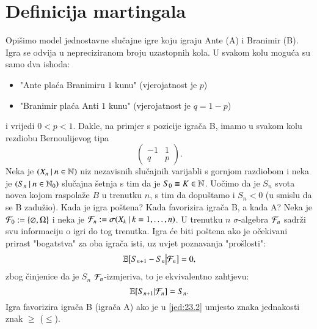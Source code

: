 
\chapter{Definicija martingala}

\begin{pr}  \label{pr:23.1}
    Opi\v simo model jednostavne slu\v cajne igre koju igraju Ante (A) i Branimir (B).
    Igra se odvija u nepreciziranom broju uzastopnih kola.
    U svakom kolu mogu\' ca su samo dva ishoda:
    \begin{itemize}
        \item[] "Ante pla\' ca Branimiru $1$ kunu" (vjerojatnost je $p$)
        \item[] "Branimir pla\' ca Anti $1$ kunu" (vjerojatnost je $q = 1 - p$) 
    \end{itemize}
    i vrijedi $0 < p < 1$.
    Dakle, na primjer s pozicije igra\v ca B, imamo u svakom kolu rezdiobu Bernoulijevog tipa
    \begin{equation*}
        \begin{pmatrix}
            -1& 1\\
            q& p
        \end{pmatrix}.
    \end{equation*}
    Neka je $({X_n} \: | \: {n \in \mathbb{N}})$ niz nezavisnih slu\v cajnih varijabli s gornjom razdiobom i neka je $({S_n} \: | \: {n \in \mathbb{N}_0})$ slu\v cajna \v setnja s tim da je $S_0 \equiv K \in \mathbb{N}$.
    Uo\v cimo da je $S_n$ svota novca kojom raspola\v ze $B$ u trenutku $n$, s tim da dopu\v stamo i $S_n < 0$ (u smislu da se B zadu\v zio).
    Kada je igra po\v stena?
    Kada favorizira igra\v ca B, a kada A?
    Neka je $\mathcal{F}_0 := \{ \varnothing, \Omega \}$ i neka je $\mathcal{F}_n := \sigma({X_k} \: | \: {k = 1, \ldots, n})$.
    U trenutku $n$ $\sigma$-algebra $\mathcal{F}_n$ sadr\v zi svu informaciju o igri do tog trenutka.
    Igra \' ce biti po\v stena ako je o\v cekivani prirast "bogatstva" za oba igra\v ca isti, uz uvjet poznavanja "pro\v slosti":
    \begin{equation*}
        \mathbb{E} \big[ S_{n + 1} - S_n \big| \mathcal{F}_n \big] = 0,
    \end{equation*}
    zbog \v cinjenice da je $S_n$ $\mathcal{F}_n$-izmjeriva, to je ekvivalentno zahtjevu:
    \begin{equation}    \label{jed:23.2}
        \mathbb{E} [S_{n + 1} | \mathcal{F}_n] = S_n.
    \end{equation}
    Igra favorizira igra\v ca B (igra\v ca A) ako je u \eqref{jed:23.2} umjesto znaka jednakosti znak $\geq$ ($\leq$).

\end{pr}
